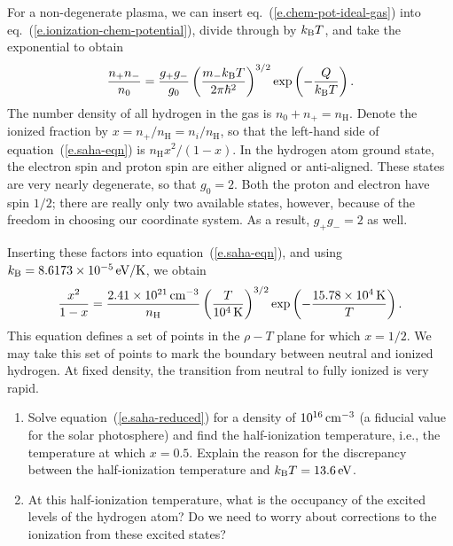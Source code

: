 For a non-degenerate plasma, we can insert eq.~(\ref{e.chem-pot-ideal-gas}) into eq.~(\ref{e.ionization-chem-potential}), divide through by $k_\mathrm{B} T$, and take the exponential to obtain
\begin{equation}\label{e.saha-eqn}
\frac{n_{+}n_{-}}{n_{0}} = \frac{g_{+}g_{-}}{g_{0}}\left(\frac{m_{-}k_\mathrm{B} T}{2\pi\hbar^{2}}\right)^{3/2}\exp\left(-\frac{Q}{k_\mathrm{B} T}\right).
\end{equation}
The number density of all hydrogen in the gas is $n_{0}+n_{+} = n_{\mathrm{H}}$.  Denote the ionized fraction by $x = n_{+}/n_{\mathrm{H}} = n_{i}/n_{\mathrm{H}}$, so that the left-hand side of equation~(\ref{e.saha-eqn}) is $n_{\mathrm{H}} x^{2}/(1-x)$. In the hydrogen atom ground state, the electron spin and proton spin are either aligned or anti-aligned. These states are very nearly degenerate, so that $g_{0} = 2$.  Both the proton and electron have spin $1/2$; there are really only two available states, however, because of the freedom in choosing our coordinate system.  As a result, $g_{+}g_{-} = 2$ as well.

Inserting these factors into equation~(\ref{e.saha-eqn}), and using $k_\mathrm{B} = 8.6173\times 10^{-5}\,\mathrm{eV}/\mathrm{K}$, we obtain
\begin{equation}\label{e.saha-reduced}
\frac{x^{2}}{1-x} = \frac{2.41\times 10^{21}\,\mathrm{c}\mathrm{m}^{-3}}{n_{\mathrm{H}}} \left(\frac{T}{10^{4}\,\mathrm{K}}\right)^{3/2}\exp\left(-\frac{15.78\times 10^{4}\,\mathrm{K}}{T}\right).
\end{equation}
This equation defines a set of points in the $\rho-T$ plane for which $x = 1/2$.  We may take this set of points to mark the boundary between neutral and ionized hydrogen. At fixed density, the transition from neutral to fully ionized is very rapid.
\newpage

\begin{exercisebox}
\begin{enumerate}
\item Solve equation~(\ref{e.saha-reduced}) for a density of $10^{16}\,\mathrm{c}\mathrm{m}^{-3}$ (a fiducial value for the solar photosphere) and find the half-ionization temperature, i.e., the temperature at which $x=0.5$.  Explain the reason for the discrepancy between the half-ionization temperature and $k_\mathrm{B} T = 13.6\,\mathrm{eV}$.

\item At this half-ionization temperature, what is the occupancy of the excited levels of the hydrogen atom?  Do we need to worry about corrections to the ionization from these excited states?
\end{enumerate}
\end{exercisebox}

